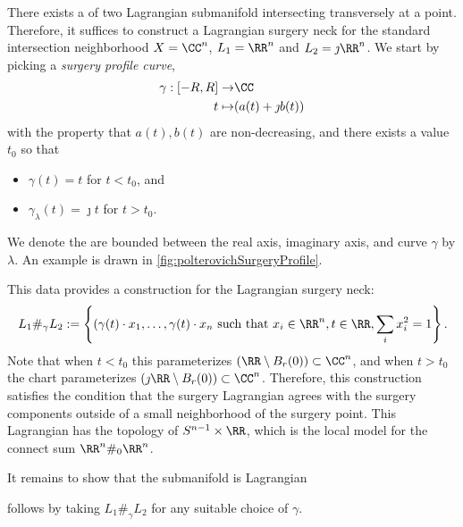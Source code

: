 
 
 

There exists a  of two Lagrangian submanifold intersecting transversely at a point. Therefore, it suffices to construct a Lagrangian surgery neck for the standard intersection neighborhood $X=\CC^n$, $L_1=\RR^n$ and $L_2=\jmath\RR^n$.
We start by picking a \emph{surgery profile curve},  
\begin{align*}
      \gamma: [-R, R] \to& \CC\\
      t\mapsto& (a(t)+\jmath b(t))
\end{align*}
with the property that $a(t), b(t)$ are non-decreasing, and there exists a value $t_0$ so that 
\begin{itemize}
      \item  $\gamma(t)=t$ for $t< t_0$, and
      \item  $\gamma_\lambda(t)=\jmath t$ for $t>t_0$.
\end{itemize}
We denote the are bounded between the real axis, imaginary axis, and curve $\gamma$ by $\lambda$.
An example is drawn in \cref{fig:polterovichSurgeryProfile}.

This data provides a construction for the Lagrangian surgery neck:
\[
	L_1\#_\gamma L_2:=\left\{(\gamma(t)\cdot x_1,\ldots,  \gamma(t)\cdot x_n \text{ such that } x_i \in \RR^n,t\in \RR, \sum_{i} x_i^2=1\right\}.
\]
Note that when $t < t_0$ this parameterizes $(\RR\setminus B_r(0))\subset \CC^n$, and when $t > t_0$ the chart parameterizes $(\jmath \RR \setminus B_r(0))\subset \CC^n$. 
Therefore, this construction satisfies the condition that the surgery Lagrangian agrees with the surgery components outside of a small neighborhood of the surgery point.
This Lagrangian has the topology of $S^{n-1}\times \RR$, which is the local model for the connect sum $\RR^n\#_0\RR^n$.

It remains to show that the submanifold is Lagrangian \todo{}


 follows by taking $L_1\#_\gamma L_2$ for any suitable choice of $\gamma$.
 